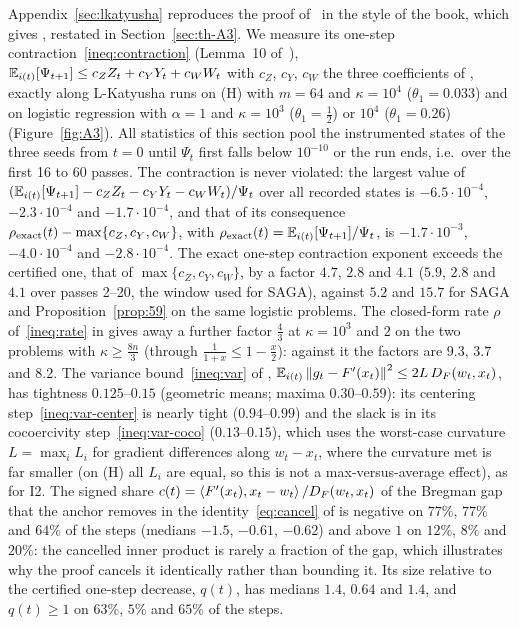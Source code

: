 Appendix~\ref{sec:lkatyusha} reproduces the proof of~\cite{kovalev2020dont} in the style of the book, which gives
, restated in Section~\ref{sec:th-A3}. We measure its one-step contraction~\eqref{ineq:contraction}
(Lemma~10 of~\cite{kovalev2020dont}), $\mathbb{E}_{i(t)}[\Psi_{t+1}]\le c_ZZ_t+c_YY_t+c_WW_t$ with $c_Z$, $c_Y$, $c_W$ the three
coefficients of , exactly along L-Katyusha runs on (H) with $m=64$ and $\kappa=10^4$ ($\theta_1=0.033$)
and on logistic regression with $\alpha=1$ and $\kappa=10^3$ ($\theta_1=\frac12$) or $10^4$ ($\theta_1=0.26$)
(Figure~\ref{fig:A3}). All statistics of this section pool the instrumented states of the three seeds from $t=0$ until
$\Psi_t$ first falls below $10^{-10}$ or the run ends, i.e.\ over the first 16 to 60 passes. The contraction is never
violated: the largest value of $(\mathbb{E}_{i(t)}[\Psi_{t+1}]-c_ZZ_t-c_YY_t-c_WW_t)/\Psi_t$ over all recorded states is
$-6.5\cdot10^{-4}$, $-2.3\cdot10^{-4}$ and $-1.7\cdot10^{-4}$, and that of its consequence
$\rho_{\rm exact}(t)-\max\{c_Z,c_Y,c_W\}$, with $\rho_{\rm exact}(t)=\mathbb{E}_{i(t)}[\Psi_{t+1}]/\Psi_t$, is $-1.7\cdot10^{-3}$,
$-4.0\cdot10^{-4}$ and $-2.8\cdot10^{-4}$. The exact one-step contraction exponent exceeds the certified one, that of
$\max\{c_Z,c_Y,c_W\}$, by a factor $4.7$, $2.8$ and $4.1$ ($5.9$, $2.8$ and $4.1$ over passes 2--20, the window used for
SAGA), against $5.2$ and $15.7$ for SAGA and Proposition~\ref{prop:59} on the same logistic problems. The closed-form rate
$\rho$ of~\eqref{ineq:rate} in  gives away a further factor $\frac43$ at $\kappa=10^3$ and $2$ on the two
problems with $\kappa\ge\frac{8n}3$ (through $\frac1{1+x}\le1-\frac x2$): against it the factors are $9.3$, $3.7$ and
$8.2$. The variance bound~\eqref{ineq:var} of , $\mathbb{E}_{i(t)}\left\|g_t-F'(x_t)\right\|^2\le2L\,D_F(w_t,x_t)$, has
tightness $0.125$--$0.15$ (geometric means; maxima $0.30$--$0.59$): its centering step~\eqref{ineq:var-center} is nearly
tight ($0.94$--$0.99$) and the slack is in its cocoercivity step~\eqref{ineq:var-coco} ($0.13$--$0.15$), which uses the
worst-case curvature $L=\max_iL_i$ for gradient differences along $w_t-x_t$, where the curvature met is far smaller (on
(H) all $L_i$ are equal, so this is not a max-versus-average effect), as for I2. The signed share
$c(t)=\left\langle F'(x_t), x_t-w_t \right\rangle/D_F(w_t,x_t)$ of the Bregman gap that the anchor removes in the identity~\eqref{eq:cancel}
of  is negative on $77\%$, $77\%$ and $64\%$ of the steps (medians $-1.5$, $-0.61$, $-0.62$) and above
$1$ on $12\%$, $8\%$ and $20\%$: the cancelled inner product is rarely a fraction of the gap, which illustrates why the
proof cancels it identically rather than bounding it. Its size relative to the certified one-step decrease, $q(t)$, has
medians $1.4$, $0.64$ and $1.4$, and $q(t)\ge1$ on $63\%$, $5\%$ and $65\%$ of the steps.

